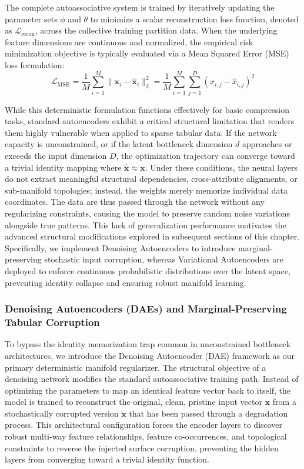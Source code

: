 The complete autoassociative system is trained by iteratively updating the parameter sets $\phi$ and $\theta$ to minimize a scalar reconstruction loss function, denoted as $\mathcal{L}_{\text{recon}}$, across the collective training partition data. When the underlying feature dimensions are continuous and normalized, the empirical risk minimization objective is typically evaluated via a Mean Squared Error (MSE) loss formulation:
\begin{equation}\label{eq:7.3}
    \mathcal{L}_{\text{MSE}} = \frac{1}{M}\sum_{i=1}^{M} \|\mathbf{x}_i - \hat{\mathbf{x}}_i\|_2^2 = \frac{1}{M}\sum_{i=1}^{M}\sum_{j=1}^{D}(x_{i,j} - \hat{x}_{i,j})^2
\end{equation}

While this deterministic formulation functions effectively for basic compression tasks, standard autoencoders exhibit a critical structural limitation that renders them highly vulnerable when applied to sparse tabular data. If the network capacity is unconstrained, or if the latent bottleneck dimension $d$ approaches or exceeds the input dimension $D$, the optimization trajectory can converge toward a trivial identity mapping where $\hat{\mathbf{x}} \approx \mathbf{x}$. Under these conditions, the neural layers do not extract meaningful structural dependencies, cross-attribute alignments, or sub-manifold topologies; instead, the weights merely memorize individual data coordinates. The data are thus passed through the network without any regularizing constraints, causing the model to preserve random noise variations alongside true patterns. This lack of generalization performance motivates the advanced structural modifications explored in subsequent sections of this chapter. Specifically, we implement Denoising Autoencoders to introduce marginal-preserving stochastic input corruption, whereas Variational Autoencoders are deployed to enforce continuous probabilistic distributions over the latent space, preventing identity collapse and ensuring robust manifold learning.

\subsubsection{Denoising Autoencoders (DAEs) and Marginal-Preserving Tabular Corruption}

To bypass the identity memorization trap common in unconstrained bottleneck architectures, we introduce the Denoising Autoencoder (DAE) framework as our primary deterministic manifold regularizer. The structural objective of a denoising network modifies the standard autoassociative training path. Instead of optimizing the parameters to map an identical feature vector back to itself, the model is trained to reconstruct the original, clean, pristine input vector $\mathbf{x}$ from a stochastically corrupted version $\tilde{\mathbf{x}}$ that has been passed through a degradation process. This architectural configuration forces the encoder layers to discover robust multi-way feature relationships, feature co-occurrences, and topological constraints to reverse the injected surface corruption, preventing the hidden layers from converging toward a trivial identity function.


